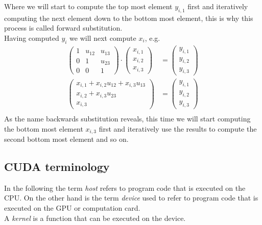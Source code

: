 Where we will start to compute the top most element $y_{i,1}$ first and iteratively computing the next element down to the bottom most element, this is why this process is called forward substitution.
\vspace{0.3cm}\\
Having computed $y_i$ we will next compute $x_i$, e.g.
\begin{align*}
\begin{pmatrix} 1 & u_{12} & u_{13}\\
0 & 1 & u_{23}\\
0 & 0 & 1
\end{pmatrix} \cdot \begin{pmatrix} x_{i,1} \\ x_{i,2} \\ x_{i,3}	\end{pmatrix}
& = \begin{pmatrix} y_{i,1} \\ y_{i,2} \\ y_{i,3}	\end{pmatrix}\\
\begin{pmatrix}
x_{i,1} + x_{i,2} u_{12} + x_{i,3} u_{13}\\ x_{i,2} + x_{i,3} u_{23}\\
x_{i,3}
\end{pmatrix}	& = \begin{pmatrix} y_{i,1} \\ y_{i,2} \\ y_{i,3}	\end{pmatrix}\\
\end{align*}
As the name backwards substitution reveals, this time we will start computing the bottom most element $x_{i,3}$ first and iteratively use the results to compute the second bottom most element and so on.

\subsection*{CUDA terminology}
In the following the term \emph{host} refers to program code that is executed on the CPU. On the other hand is the term \emph{device} used to refer to program code that is executed on the GPU or computation card.\\
A \emph{kernel} is a function that can be executed on the device.

